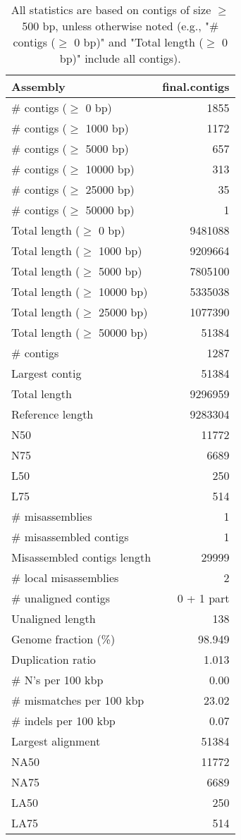 \documentclass[12pt,a4paper]{article}
\begin{document}
\begin{table}[ht]
\begin{center}
\caption{All statistics are based on contigs of size $\geq$ 500 bp, unless otherwise noted (e.g., "\# contigs ($\geq$ 0 bp)" and "Total length ($\geq$ 0 bp)" include all contigs).}
\begin{tabular}{|l*{1}{|r}|}
\hline
Assembly & final.contigs \\ \hline
\# contigs ($\geq$ 0 bp) & 1855 \\ \hline
\# contigs ($\geq$ 1000 bp) & 1172 \\ \hline
\# contigs ($\geq$ 5000 bp) & 657 \\ \hline
\# contigs ($\geq$ 10000 bp) & 313 \\ \hline
\# contigs ($\geq$ 25000 bp) & 35 \\ \hline
\# contigs ($\geq$ 50000 bp) & 1 \\ \hline
Total length ($\geq$ 0 bp) & 9481088 \\ \hline
Total length ($\geq$ 1000 bp) & 9209664 \\ \hline
Total length ($\geq$ 5000 bp) & 7805100 \\ \hline
Total length ($\geq$ 10000 bp) & 5335038 \\ \hline
Total length ($\geq$ 25000 bp) & 1077390 \\ \hline
Total length ($\geq$ 50000 bp) & 51384 \\ \hline
\# contigs & 1287 \\ \hline
Largest contig & 51384 \\ \hline
Total length & 9296959 \\ \hline
Reference length & 9283304 \\ \hline
N50 & 11772 \\ \hline
N75 & 6689 \\ \hline
L50 & 250 \\ \hline
L75 & 514 \\ \hline
\# misassemblies & 1 \\ \hline
\# misassembled contigs & 1 \\ \hline
Misassembled contigs length & 29999 \\ \hline
\# local misassemblies & 2 \\ \hline
\# unaligned contigs & 0 + 1 part \\ \hline
Unaligned length & 138 \\ \hline
Genome fraction (\%) & 98.949 \\ \hline
Duplication ratio & 1.013 \\ \hline
\# N's per 100 kbp & 0.00 \\ \hline
\# mismatches per 100 kbp & 23.02 \\ \hline
\# indels per 100 kbp & 0.07 \\ \hline
Largest alignment & 51384 \\ \hline
NA50 & 11772 \\ \hline
NA75 & 6689 \\ \hline
LA50 & 250 \\ \hline
LA75 & 514 \\ \hline
\end{tabular}
\end{center}
\end{table}
\end{document}
